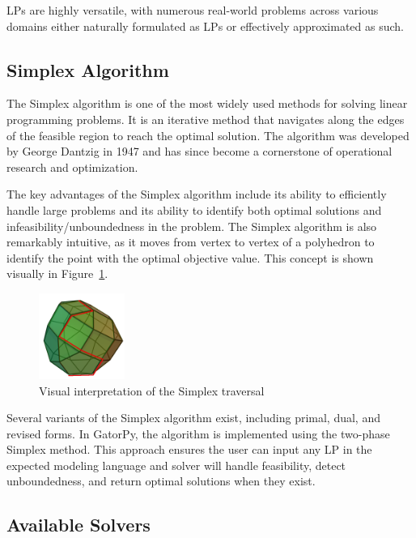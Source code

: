 \documentclass[conference]{IEEEtran}
\begin{document}
LPs are highly versatile, with numerous real-world problems across various domains either naturally formulated as LPs or effectively approximated as such.

\subsection{Simplex Algorithm}

The Simplex algorithm is one of the most widely used methods for solving linear programming problems. 
It is an iterative method that navigates along the edges of the feasible region to reach the optimal solution. 
The algorithm was developed by George Dantzig in 1947 and has since become a cornerstone of operational research and optimization.

The key advantages of the Simplex algorithm include its ability to efficiently handle large problems and its ability to identify both optimal solutions and infeasibility/unboundedness in the problem. 
The Simplex algorithm is also remarkably intuitive, as it moves from vertex to vertex of a polyhedron to identify the point with the optimal objective value.
This concept is shown visually  in Figure~\ref{fig:simplex}.

\begin{figure}[htbp]
  \centerline{\includegraphics[width=0.25\textwidth]{images/simplex.png}}
  \caption{Visual interpretation of the Simplex traversal \cite{img:simplex}}
  \label{fig:simplex}
\end{figure}

Several variants of the Simplex algorithm exist, including primal, dual, and revised forms. 
In GatorPy, the algorithm is implemented using the two-phase Simplex method.
This approach ensures the user can input any LP in the expected modeling language and solver will handle feasibility, detect unboundedness, and return optimal solutions when they exist.

\subsection{Available Solvers}
\end{document}
